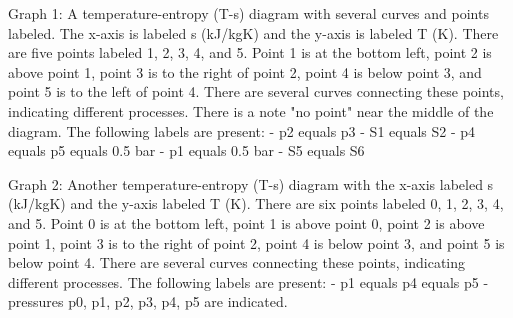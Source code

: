 Graph 1: A temperature-entropy (T-s) diagram with several curves and points labeled. The x-axis is labeled s (kJ/kgK) and the y-axis is labeled T (K). There are five points labeled 1, 2, 3, 4, and 5. Point 1 is at the bottom left, point 2 is above point 1, point 3 is to the right of point 2, point 4 is below point 3, and point 5 is to the left of point 4. There are several curves connecting these points, indicating different processes. There is a note "no point" near the middle of the diagram. The following labels are present:
- p2 equals p3
- S1 equals S2
- p4 equals p5 equals 0.5 bar
- p1 equals 0.5 bar
- S5 equals S6

Graph 2: Another temperature-entropy (T-s) diagram with the x-axis labeled s (kJ/kgK) and the y-axis labeled T (K). There are six points labeled 0, 1, 2, 3, 4, and 5. Point 0 is at the bottom left, point 1 is above point 0, point 2 is above point 1, point 3 is to the right of point 2, point 4 is below point 3, and point 5 is below point 4. There are several curves connecting these points, indicating different processes. The following labels are present:
- p1 equals p4 equals p5
- pressures p0, p1, p2, p3, p4, p5 are indicated.